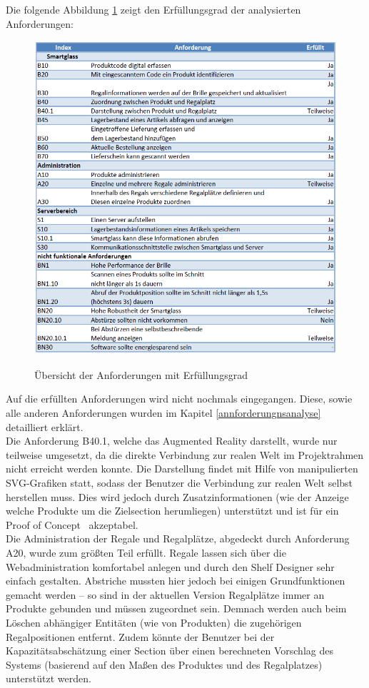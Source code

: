 Die folgende Abbildung \ref{fig:anforderungen_erfuellt} zeigt den Erfüllungsgrad der analysierten Anforderungen:
\begin{figure}[H]
	\centering
	{\includegraphics[width=\textwidth]{Bilder/Abbildungen/anforderungen_zusammenfassung_bewertung.png}}
	\caption{Übersicht der Anforderungen mit Erfüllungsgrad}
	\label{fig:anforderungen_erfuellt}
\end{figure}
Auf die erfüllten Anforderungen wird nicht nochmals eingegangen. Diese, sowie alle anderen Anforderungen wurden im Kapitel \ref{annforderungnsanalyse}  detailliert erklärt.\\
Die Anforderung B40.1, welche das Augmented Reality darstellt, wurde nur teilweise umgesetzt, da die direkte Verbindung zur realen Welt im Projektrahmen nicht erreicht werden konnte. Die Darstellung findet mit Hilfe von manipulierten SVG-Grafiken statt, sodass der Benutzer die Verbindung zur realen Welt selbst herstellen muss. Dies wird jedoch durch Zusatzinformationen (wie \zB der Anzeige welche Produkte um die Zielsection herumliegen) unterstützt und ist für ein \glqq Proof of Concept\grqq~ akzeptabel.\\

Die Administration der Regale und Regalplätze, abgedeckt durch Anforderung A20, wurde zum größten Teil erfüllt. Regale lassen sich über die Webadministration komfortabel anlegen und durch den Shelf Designer sehr einfach gestalten. Abstriche mussten hier jedoch bei einigen Grundfunktionen gemacht werden -- so sind in der aktuellen Version Regalplätze immer an Produkte gebunden und müssen zugeordnet sein. Demnach werden auch beim Löschen abhängiger Entitäten (wie von Produkten) die zugehörigen Regalpositionen entfernt. Zudem könnte der Benutzer bei der Kapazitätsabschätzung einer Section über einen berechneten Vorschlag des Systems (basierend auf den Maßen des Produktes und des Regalplatzes) unterstützt werden.\\


